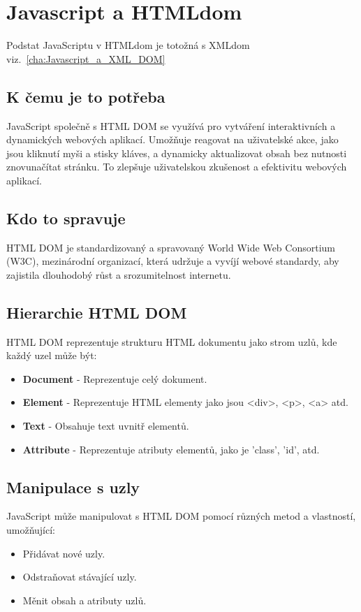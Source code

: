 \chapter{Javascript a HTMLdom}
\label{cha:Javascript_a_HTMLdom}
Podstat JavaScriptu v HTMLdom je totožná s XMLdom viz.~\ref{cha:Javascript_a_XML_DOM}

\section{K čemu je to potřeba}
JavaScript společně s HTML DOM se využívá pro vytváření interaktivních a dynamických webových aplikací. Umožňuje reagovat na uživatelské akce, jako jsou kliknutí myši a stisky kláves, a dynamicky aktualizovat obsah bez nutnosti znovunačítat stránku. To zlepšuje uživatelskou zkušenost a efektivitu webových aplikací.

\section{Kdo to spravuje}
HTML DOM je standardizovaný a spravovaný World Wide Web Consortium (W3C), mezinárodní organizací, která udržuje a vyvíjí webové standardy, aby zajistila dlouhodobý růst a srozumitelnost internetu.


\section{Hierarchie HTML DOM}

HTML DOM reprezentuje strukturu HTML dokumentu jako strom uzlů, kde každý uzel může být:
\begin{itemize}
  \item \textbf{Document} - Reprezentuje celý dokument.
  \item \textbf{Element} - Reprezentuje HTML elementy jako jsou <div>, <p>, <a> atd.
  \item \textbf{Text} - Obsahuje text uvnitř elementů.
  \item \textbf{Attribute} - Reprezentuje atributy elementů, jako je 'class', 'id', atd.
\end{itemize}

\section{Manipulace s uzly}

JavaScript může manipulovat s HTML DOM pomocí různých metod a vlastností, umožňující:
\begin{itemize}
  \item Přidávat nové uzly.
  \item Odstraňovat stávající uzly.
  \item Měnit obsah a atributy uzlů.
\end{itemize}
